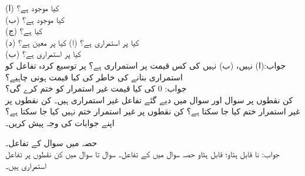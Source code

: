 (ا) \quad کیا  موجود ہے؟\\
(ب) \quad  کیا  موجود ہے؟\\
(ج) \quad  کیا  ہے؟\\
(د)  \quad  کیا  پر  استمراری ہے؟
(ا) \quad کیا  پر  معین ہے؟\\
(ب) \quad  کیا  پر  استمراری ہے؟ \\
جواب:\quad (ا) نہیں، (ب) نہیں
 کی کس قیمت پر  استمراری ہے؟
 پر توسیع کردہ تفاعل کو استمراری بنانے کی خاطر  کی کیا قیمت ہونی چاہیے؟\\
جواب:\quad 
$0$
 کی کیا قیمت غیر استمرار کو ختم کرے گی؟
\\
کن نقطوں پر سوال  اور سوال  میں دیے گئے تفاعل غیر استمراری ہیں۔ کن نقطوں پر غیر استمرار ختم کیا جا سکتا ہے؟ کن نقطوں پر غیر استمرار ختم نہیں کیا جا سکتا ہے؟ اپنے جوابات کی وجہ پیش کریں۔ 

حصہ  میں سوال  کے تفاعل۔\\
جواب:\quad {} نا قابل ہٹاو؛  قابل ہٹاو
حصہ  سوال  میں کے تفاعل۔
سوال  تا سوال   میں کن نقطوں پر تفاعل استمراری ہیں۔

